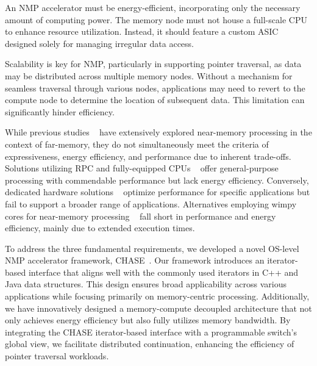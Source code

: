  An NMP accelerator must be energy-efficient, incorporating only the necessary amount of computing power. The memory node must not house a full-scale CPU to enhance resource utilization. Instead, it should feature a custom ASIC designed solely for managing irregular data access.

 Scalability is key for NMP, particularly in supporting pointer traversal, as data may be distributed across multiple memory nodes. Without a mechanism for seamless traversal through various nodes, applications may need to revert to the compute node to determine the location of subsequent data. This limitation can significantly hinder efficiency.

While previous studies ~\cite{strom, clio, impica, aifm} have extensively explored near-memory processing in the context of far-memory, they do not simultaneously meet the criteria of expressiveness, energy efficiency, and performance due to inherent trade-offs. Solutions utilizing RPC and fully-equipped CPUs ~\cite{aifm, zhang2022_teleport} offer general-purpose processing with commendable performance but lack energy efficiency. Conversely, dedicated hardware solutions ~\cite{strom, impica} optimize performance for specific applications but fail to support a broader range of applications. Alternatives employing wimpy cores for near-memory processing ~\cite{clio} fall short in performance and energy efficiency, mainly due to extended execution times.

To address the three fundamental requirements, we developed a novel OS-level NMP accelerator framework, CHASE~\cite{chase}. Our framework introduces an iterator-based interface that aligns well with the commonly used iterators in C++ and Java data structures. This design ensures broad applicability across various applications while focusing primarily on memory-centric processing. Additionally, we have innovatively designed a memory-compute decoupled architecture that not only achieves energy efficiency but also fully utilizes memory bandwidth. By integrating the CHASE iterator-based interface with a programmable switch's global view, we facilitate distributed continuation, enhancing the efficiency of pointer traversal workloads. 

